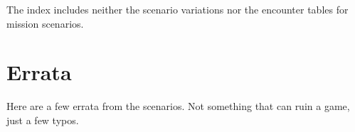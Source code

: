 \documentclass[a4paper,twocolumn]{article}
\begin{document}
The index includes  neither the scenario variations  nor the encounter
tables for mission scenarios.

\vspace{3mm}


\section*{Errata}

Here are a few errata from the scenarios. Not something that can ruin a game, just
a few typos.

\vspace{3mm}

\end{document}
